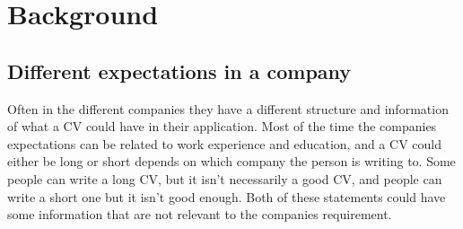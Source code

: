 \section{Background}\label{sec:background}
\subsection{Different expectations in a company}
Often in the different companies they have a different structure and information of what a CV could have in their application.
Most of the time the companies expectations can be related to work experience and education,
and a CV could either be long or short depends on which company the person is writing to. Some people can write a long CV,
but it isn't necessarily a good CV, and people can write a short one but it isn't good enough. 
Both of these statements could have some information that are not relevant to the companies requirement. 
